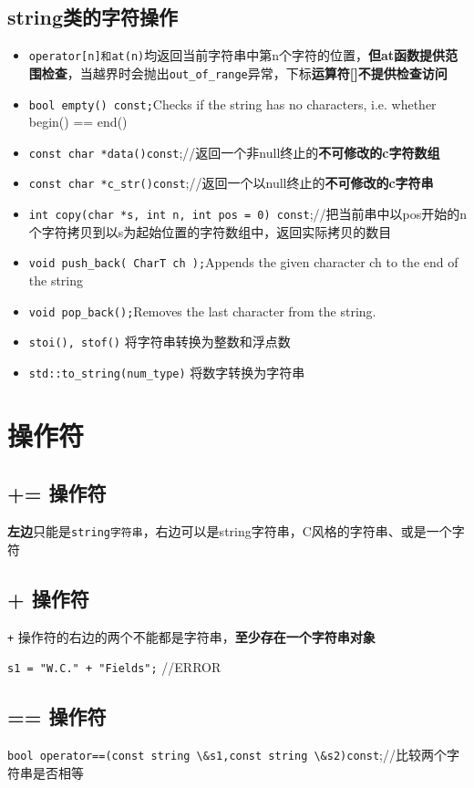 \documentclass[UTF8,a4paper,12pt]{ctexbook} %
\begin{document}
		\subsection{string类的字符操作}
			\begin{itemize}
				\item \verb|operator[n]和at(n)|均返回当前字符串中第n个字符的位置，\textbf{但at函数提供范围检查}，当越界时会抛出\verb|out_of_range|异常，下标\textbf{运算符[]不提供检查访问}
				\item \verb|bool empty() const;|Checks if the string has no characters, i.e. whether begin() == end()
				\item \verb|const char *data()const|;//返回一个非null终止的\textbf{不可修改的c字符数组}
				\item \verb|const char *c_str()const|;//返回一个以null终止的\textbf{不可修改的c字符串}
				\item \verb|int copy(char *s, int n, int pos = 0) const|;//把当前串中以pos开始的n个字符拷贝到以s为起始位置的字符数组中，返回实际拷贝的数目
				\item \verb|void push_back( CharT ch );|Appends the given character ch to the end of the string
				\item \verb|void pop_back();|Removes the last character from the string.
				\item \verb|stoi(), stof()| 将字符串转换为整数和浮点数
				\item \verb|std::to_string(num_type)| 将数字转换为字符串
			\end{itemize}
    \section{操作符}
         \subsection{+= 操作符}
	          \textbf{左边}只能是\verb|string字符串|，右边可以是string字符串，C风格的字符串、或是一个字符
         
         \subsection{+ 操作符}
	          \verb|+| 操作符的右边的两个不能都是字符串，\textbf{至少存在一个字符串对象}
         
	          \verb|s1 = "W.C." + "Fields";|                            //ERROR
         
         \subsection{== 操作符}
	         \verb|bool operator==(const string \&s1,const string \&s2)const|;//比较两个字符串是否相等
         
\end{document}
